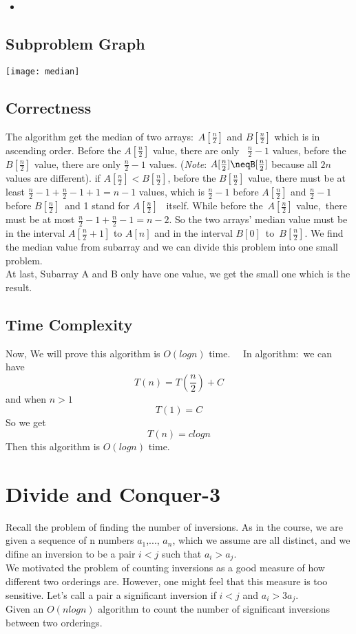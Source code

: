 \documentclass{article}
\newcommand{\pythonscript}[2]{
\begin{itemize}
\item[]
\end{itemize}
}
\begin{document}
    \pythonscript{getmedian}{Get the median value for two ordered array}
    \subsection{Subproblem Graph}
        \begin{center}
            \texttt{[image: median]} %
        \end{center}
    \subsection{Correctness}
    The algorithm get the median of two arrays: $A[\frac{n}{2}]$ and $B[\frac{n}{2}]$ which
     is in ascending order. Before the $A[\frac{n}{2}]$ value, there are only  $\frac{n}{2}-1$ values, before the $B[\frac{n}{2}]$ value, there are only $\frac{n}{2}-1$ values. 
     (\emph{Note}: $A[\frac{n}{2}]\neqB[\frac{n}{2}]$  because all $2n$ values are different). if $A[\frac{n}{2}] < B[\frac{n}{2}]$, before the $B[\frac{n}{2}]$ value, there must be at least $\frac{n}{2}-1 + \frac{n}{2}-1+1 = n-1$ values, which is $\frac{n}{2}-1$ before $A[\frac{n}{2}]$ and $\frac{n}{2}-1$ before $B[\frac{n}{2}]$ and  1  stand for $A[\frac{n}{2}]$  itself. While before the $A[\frac{n}{2}]$ value, there must be at most $\frac{n}{2}-1+\frac{n}{2}-1=n-2$. So the two arrays’ median value must be in the interval $A[\frac{n}{2}+1]$ to $A[n]$ and in the interval $B[0]$ to $B[\frac{n}{2}]$. We find the median value from  subarray and we can divide this problem into one small problem.\\At last, Subarray A and B only have one value, we get the small one which is the result. 
    \subsection{Time Complexity}
    Now, We will prove this algorithm is $O(log n)$ time.  
    In algorithm: we can have $$T(n)=T(\frac{n}{2})+C$$ and when $n>1$ $$T(1)=C$$ So we get $$T(n)=clog n$$
    Then this algorithm is $O(log n)$ time.
\section{Divide and Conquer-3}
    Recall the problem of finding the number of inversions. As in the course, we are given a sequence of n numbers $a_1$,..., $a_n$, which we assume are all distinct, and we difine an inversion to be a pair $i < j$ such that $a_i > a_j$.                                                                               \\
    We motivated the problem of counting inversions as a good measure of how different two orderings are. However, one might feel that this measure is too sensitive. Let’s call a pair a significant inversion if $i < j$ and $a_i > 3a_j$.                                                                                \\
    Given an $O(n log n)$ algorithm to count the number of significant inversions between two orderings.  \\
\end{document}
